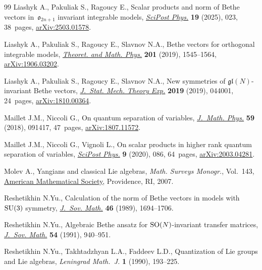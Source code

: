 \documentclass[10pt,a4paper]{amsart}
\theoremstyle{definition}
\begin{document}
\begin{thebibliography}{99}
Liashyk A., Pakuliak S., Ragoucy E., Scalar products and norm of {B}ethe
 vectors in~{$\mathfrak{o}_{2n+1}$} invariant integrable models,
 \href{https://doi.org/10.21468/SciPostPhys.19.1.023}{\textit{SciPost Phys.}}
 \textbf{19} (2025), 023, 38~pages,
 \href{http://arxiv.org/abs/2503.01578}{arXiv:2503.01578}.

Liashyk A., Pakuliak S., Ragoucy E., Slavnov N.A., Bethe vectors for orthogonal
 integrable models,
 \href{https://doi.org/10.1134/S0040577919110023}{\textit{Theoret. and Math.
 Phys.}} \textbf{201} (2019), 1545--1564,
 \href{http://arxiv.org/abs/1906.03202}{arXiv:1906.03202}.

Liashyk A., Pakuliak S., Ragoucy E., Slavnov N.A., New symmetries of
 {$\mathfrak{gl}(N)$}-invariant {B}ethe vectors,
 \href{https://doi.org/10.1088/1742-5468/ab02f0}{\textit{J.~Stat. Mech. Theory
 Exp.}} \textbf{2019} (2019), 044001, 24~pages,
 \href{http://arxiv.org/abs/1810.00364}{arXiv:1810.00364}.

Maillet J.M., Niccoli G., On quantum separation of variables,
 \href{https://doi.org/10.1063/1.5050989}{\textit{J.~Math. Phys.}} \textbf{59}
 (2018), 091417, 47~pages,
 \href{http://arxiv.org/abs/1807.11572}{arXiv:1807.11572}.

Maillet J.M., Niccoli G., Vignoli L., On scalar products in higher rank quantum
 separation of variables,
 \href{https://doi.org/10.21468/SciPostPhys.9.6.086}{\textit{SciPost Phys.}}
 \textbf{9} (2020), 086, 64~pages,
 \href{http://arxiv.org/abs/2003.04281}{arXiv:2003.04281}.

Molev A., Yangians and classical {L}ie algebras, \textit{Math. Surveys
 Monogr.}, Vol.~143, \href{https://doi.org/10.1090/surv/143}{American
 Mathematical Society}, Providence, RI, 2007.

Reshetikhin N.Yu., Calculation of the norm of {B}ethe vectors in models
 with~{${\rm SU}(3)$} symmetry,
 \href{https://doi.org/10.1007/BF01099200}{\textit{J.~Sov. Math.}} \textbf{46}
 (1989), 1694--1706.

Reshetikhin N.Yu., Algebraic {B}ethe ansatz for {${\rm SO}(N)$}-invariant
 transfer matrices, \href{https://doi.org/10.1007/BF01101125}{\textit{J.~Sov.
 Math.}} \textbf{54} (1991), 940--951.

Reshetikhin N.Yu., Takhtadzhyan L.A., Faddeev L.D., Quantization of {L}ie groups
 and {L}ie algebras, \textit{Leningrad Math.~J.} \textbf{1} (1990), 193--225.


\end{thebibliography}
\end{document}
